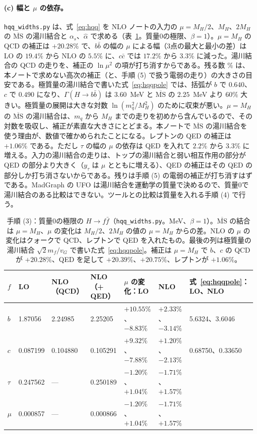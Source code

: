 \documentclass[a4paper,10pt]{ltjsarticle}
\newcommand{\MSbar}{\overline{\mathrm{MS}}}
\begin{document}
\paragraph{(c) 幅と $\mu$ の依存。}\texttt{hqq\_widths.py} は、式~\eqref{eq:hqq} を NLO ノートの入力の $\mu=M_H/2$、$M_H$、$2M_H$ の $\MSbar$ の湯川結合と $\alpha_s$、$\hat\alpha$ で求める（表~\ref{tab:hqq}。質量0の極限、$\beta=1$）。$\mu=M_H$ の QCD の補正は $+20.28\%$ で、$b\bar b$ の幅の $\mu$ による幅（3点の最大と最小の差）は LO の $19.4\%$ から NLO の $5.5\%$ に、$c\bar c$ では $17.2\%$ から $3.3\%$ に減った。湯川結合の QCD の走りを、補正の $\ln\mu^2$ の項が打ち消すからである。残る数 \% は、本ノートで求めない高次の補正（と、手順 (5) で扱う電弱の走り）の大きさの目安である。極質量の湯川結合で書いた式~\eqref{eq:hqqpole} では、括弧が $b$ で $0.640$、$c$ で $0.490$ になり、$\Gamma(H\to b\bar b)$ は $3.60$~MeV と $\MSbar$ の $2.25$~MeV より $60\%$ 大きい。極質量の展開は大きな対数 $\ln(m_q^2/M_H^2)$ のために収束が悪い。$\mu=M_H$ の $\MSbar$ の湯川結合は、$m_q$ から $M_H$ までの走りを初めから含んでいるので、その対数を吸収し、補正が素直な大きさにとどまる。本ノートで $\MSbar$ の湯川結合を使う理由が、数値で確かめられたことになる。レプトンの QED の補正は $+1.06\%$ である。ただし $\tau$ の幅の $\mu$ の依存は QED を入れて $2.2\%$ から $3.3\%$ に増える。入力の湯川結合の走りは、トップの湯川結合と弱い相互作用の部分が QED の部分より大きく（$y_\tau$ は $\mu$ とともに増える）、QED の補正はその QED の部分しか打ち消さないからである。残りは手順 (5) の電弱の補正が打ち消すはずである。MadGraph の UFO は湯川結合を運動学の質量で決めるので、質量0で湯川結合のある比較はできない。ツールとの比較は質量を入れる手順 (4) で行う。

\begin{table}[tbp]
\centering\small
\caption{手順 (3)：質量0の極限の $H\to f\bar f$（\texttt{hqq\_widths.py}。MeV、$\beta=1$）。$\MSbar$ の結合は $\mu=M_H$、$\mu$ の変化は $M_H/2$、$2M_H$ の値の $\mu=M_H$ からの差。NLO の $\mu$ の変化はクォークで QCD、レプトンで QED を入れたもの。最後の列は極質量の湯川結合 $\sqrt2m_f/v_G$ で書いた式~\eqref{eq:hqqpole}。補正は $\mu=M_H$ で $b$、$c$ の QCD が $+20.28\%$、QED を足して $+20.39\%$、$+20.75\%$、レプトンが $+1.06\%$。}
\label{tab:hqq}
\footnotesize\setlength{\tabcolsep}{3.5pt}
\begin{tabular}{lllllll}
\toprule
$f$ & LO & NLO（QCD） & NLO（+ QED） & $\mu$ の変化：LO & NLO & 式~\eqref{eq:hqqpole}：LO、NLO \\
\midrule
$b$ & 1.87056 & 2.24985 & 2.25205 & $+10.55\%$、$-8.83\%$ & $+2.33\%$、$-3.14\%$ & 5.6324、3.6046 \\
$c$ & 0.087199 & 0.104880 & 0.105291 & $+9.32\%$、$-7.88\%$ & $+1.20\%$、$-2.13\%$ & 0.68750、0.33650 \\
$\tau$ & 0.247562 & — & 0.250189 & $-1.20\%$、$+1.04\%$ & $-1.71\%$、$+1.57\%$ & \\
$\mu$ & 0.000857 & — & 0.000866 & $-1.20\%$、$+1.04\%$ & $-1.71\%$、$+1.57\%$ & \\
\bottomrule
\end{tabular}
\end{table}
\end{document}
